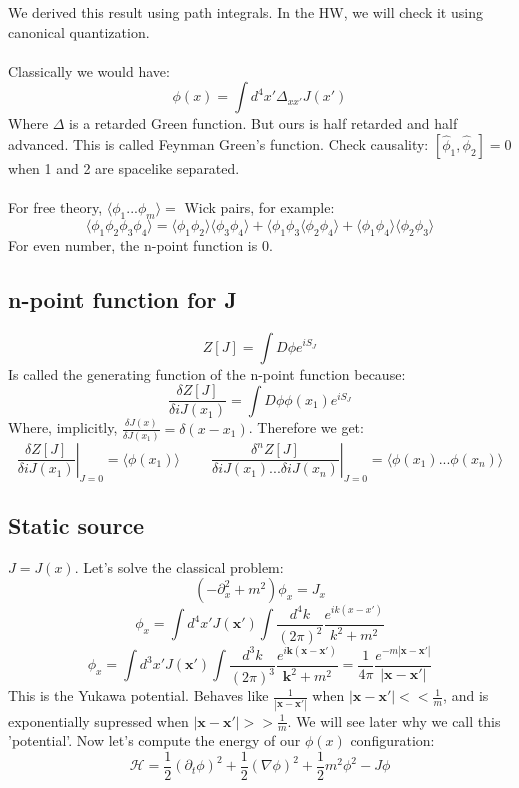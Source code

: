 \documentclass[12 pt]{article}
\begin{document}
We derived this result using path integrals. In the HW, we will check it using canonical quantization.
\\
\\
Classically we would have:
\[ \phi(x) = \int d^4 x' \Delta_{xx'} J(x') \]
Where $\Delta$ is a retarded Green function. But ours is half retarded and half advanced. This is called Feynman Green's function. Check causality: $[\hat \phi_1 , \hat \phi_2] = 0$ when 1 and 2 are spacelike separated.
\\
\\
For free theory, $\langle \phi_1 ... \phi_m \rangle = $ Wick pairs, for example:
\[  \langle \phi_1 \phi_2 \phi_3 \phi_4 \rangle = \langle \phi_1 \phi_2 \rangle \langle \phi_3 \phi_4 \rangle + \langle \phi_1 \phi_3 \langle \phi_2 \phi_4 \rangle + \langle \phi_1 \phi_4 \rangle \langle \phi_2 \phi_3 \rangle \]
For even number, the n-point function is 0.

\subsection*{n-point function for J}
\[  Z[J] = \int D\phi e^{iS_J}  \]
Is called the generating function of the n-point function because:
\[   \frac{\delta Z[J] }{\delta iJ(x_1)} = \int D\phi \phi(x_1) e^{iS_{J}} \]
Where, implicitly, $\frac{\delta J(x)}{\delta J(x_1)} = \delta(x-x_1)$. Therefore we get:
\[ \left.  \frac{\delta Z[J] }{\delta iJ(x_1)}\right|_{J=0} = \langle \phi(x_1) \rangle  \;\;\;\;\;\;\;\; \left.  \frac{\delta^n Z[J] }{\delta iJ(x_1) ... \delta iJ(x_n)}\right|_{J=0} = \langle \phi(x_1) ... \phi(x_n)\rangle \]

\subsection*{Static source}
$J = J(x) $. Let's solve the classical problem:
\[  (-\partial^2_x +m^2)\phi_x = J_x  \]
\[ \phi_x = \int d^4 x' J(\mathbf{x'}) \int \frac{d^4 k}{(2\pi)^2} \frac{e^{ik(x-x')}}{k^2+m^2} \]
\[  \phi_x = \int d^3 x' J(\mathbf{x'}) \int \frac{d^3 k}{(2\pi)^3}  \frac{e^{i\mathbf{k(x-x')}}}{\mathbf{k}^2+m^2} = \frac{1}{4\pi} \frac{e^{-m|\mathbf{x-x'}|}}{|\mathbf{x-x'}|} \]
This is the Yukawa potential. Behaves like $\frac{1}{|\mathbf{x-x'}|}$ when $|\mathbf{x-x'}| << \frac{1}{m}$, and is exponentially supressed when $|\mathbf{x-x'}| >> \frac{1}{m}$. We will see later why we call this 'potential'. Now let's compute the energy of our $\phi(x)$ configuration:
\[  \mathcal{H} = \frac{1}{2} (\partial_t \phi)^2 + \frac{1}{2} (\nabla \phi)^2 + \frac{1}{2} m^2 \phi^2 - J\phi \]
\end{document}
